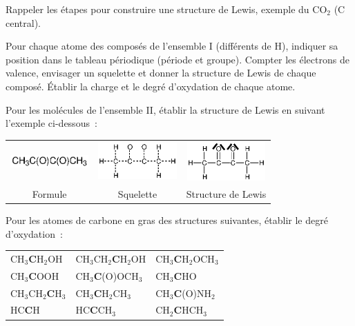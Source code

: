 
Rappeler les \'etapes pour construire une structure de Lewis, exemple du CO$_2$ 
(C central).





Pour chaque atome des compos\'es de l'ensemble I (diff\'erents de H), indiquer sa position dans 
le tableau p\'eriodique (p\'eriode et groupe). Compter les \'electrons de valence,
envisager un squelette et donner 
la structure de Lewis de chaque compos\'e. \'Etablir la charge et le degr\'e
d'oxydation de chaque atome.


Pour les mol\'ecules de l'ensemble II, \'etablir la structure de Lewis en suivant
l'exemple ci-dessous~:

\begin{center}
\begin{tabular}{ccc}
\includegraphics[width=3cm]{figure/exlewis1.eps} &
\includegraphics[width=3cm]{figure/exlewis2.eps} &
\includegraphics[width=3cm]{figure/exlewis3.eps} \\
Formule & Squelette & Structure de Lewis \\
\end{tabular}
\end{center}


Pour les atomes de carbone en gras des structures suivantes, \'etablir le degr\'e
d'oxydation~:

\begin{center}
\begin{tabular}{lll}
CH$_3$\textbf{C}H$_2$OH     & CH$_3$CH$_2$\textbf{C}H$_2$OH & CH$_3$\textbf{C}H$_2$OCH$_3$ \\
CH$_3$\textbf{C}OOH         & CH$_3$\textbf{C}(O)OCH$_3$      & CH$_3$\textbf{C}HO           \\ 
CH$_3$CH$_2$\textbf{C}H$_3$ & CH$_3$\textbf{C}H$_2$CH$_3$   & CH$_3$\textbf{C}(O)NH$_2$      \\
HC\textbf{C}H               & HC\textbf{C}CH$_3$            & CH$_2$\textbf{C}HCH$_3$      \\ 
\end{tabular}
\end{center}

